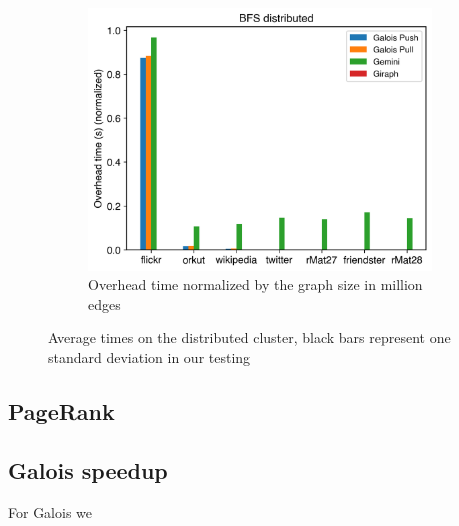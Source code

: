 \begin{figure}
\begin{subfigure}{0.3\textwidth}
		\includegraphics[width=\linewidth]{../../plots/distributedBFS_overheadTimeNormalized.png}
		\caption{Overhead time normalized by the graph size in million edges}
		\label{fig:distributedBFS_overheadNormalized}
	\end{subfigure}
	
	\caption{Average times on the distributed cluster, black bars represent one standard deviation in our testing}
\end{figure}



\subsection{PageRank}
















\subsection{Galois speedup}
\label{sec:galois_speedup}
For Galois we 


